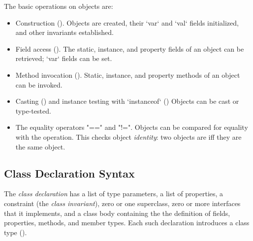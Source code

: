 The basic operations on objects are:
\begin{itemize}

\item Construction ().  Objects are created, 
      their \xcd`var` and \xcd`val` fields initialized, and other invariants
      established.

\item Field access (). 
The static, instance, and property fields of an object can be retrieved; \xcd`var` fields
can be set.  

\item Method invocation ().  
Static, instance, and property methods of an object can be invoked.

\item Casting () and instance testing with \xcd`instanceof`
() Objects can be cast or type-tested.  

\item The equality operators \xcd"==" and \xcd"!=".  
Objects can be compared for equality with the \Xcd{==} operation.  This checks
object {\em identity}: two objects are \Xcd{==} iff they are the same object.

\end{itemize}

  

\subsection{Class Declaration Syntax}
\label{sect:ClassDeclSyntax}

The {\em class declaration} has a list of type parameters, a list of
properties, a constraint (the {\em class invariant}), zero or one superclass,
zero or more interfaces that it implements, and a class body containing the
the definition of fields, properties, methods, and member types. Each such
declaration introduces a class type ().

